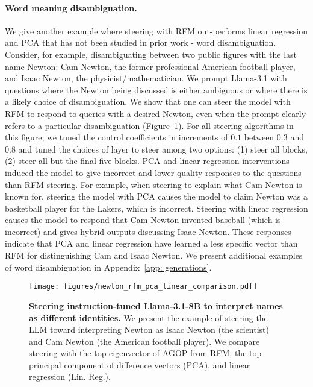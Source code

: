 \paragraph{Word meaning disambiguation.} We give another example where steering with RFM out-performs linear regression and PCA that has not been studied in prior work - word disambiguation. Consider, for example, disambiguating between two public figures with the last name Newton: Cam Newton, the former professional American football player, and Isaac Newton, the physicist/mathematician. We prompt Llama-3.1 with questions where the Newton being discussed is either ambiguous or where there is a likely choice of disambiguation. We show that one can steer the model with RFM to respond to queries with a desired Newton, even when the prompt clearly refers to a particular disambiguation (Figure~\ref{fig: rfm/pca newton, llama-3.1-8B}). For all steering algorithms in this figure, we tuned the control coefficients in increments of $0.1$ between $0.3$ and $0.8$ and tuned the choices of layer to steer among two options: (1) steer all blocks, (2) steer all but the final five blocks. PCA and linear regression interventions induced the model to give incorrect and lower quality responses to the questions than RFM steering. For example, when steering to explain what Cam Newton is known for, steering the model with PCA causes the model to claim Newton was a basketball player for the Lakers, which is incorrect. Steering with linear regression causes the model to respond that Cam Newton invented baseball (which is incorrect) and gives hybrid outputs discussing Isaac Newton. These responses indicate that PCA and linear regression have learned a less specific vector than RFM for distinguishing Cam and Isaac Newton.  We present additional examples of word disambiguation in Appendix~\ref{app: generations}.

\begin{figure}[t]
    \centering
    \texttt{[image: figures/newton\_rfm\_pca\_linear\_comparison.pdf]}
    \caption{\textbf{Steering instruction-tuned Llama-3.1-8B to interpret names as different identities.} We present the example of steering the LLM toward interpreting Newton as Isaac Newton (the scientist) and Cam Newton (the American football player). We compare steering with the top eigenvector of AGOP  from RFM, the top principal component of difference vectors (PCA), and linear regression (Lin. Reg.).}
    \label{fig: rfm/pca newton, llama-3.1-8B}
\end{figure}

